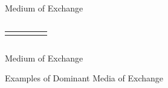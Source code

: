 \documentclass[]{beamer}
\begin{document}
\begin{frame}{Medium of Exchange}
\begin{columns}[T]
\begin{column}{0.5\textwidth}
{\begin{scriptsize}
\begin{center}
\begin{tabular}{l||c|c|c|c}
  &      &         &        & \cellcolor{black!50} \\
						\end{tabular}
					\end{center}
				\end{scriptsize}
			}
		\end{column}
	\end{columns}
\end{frame}


\begin{frame}{Medium of Exchange}
	\begin{figure}
		
	\end{figure}
\end{frame}


\begin{frame}{Examples of Dominant Media of Exchange}
	\begin{figure}
			
	\end{figure}
\end{frame}
\end{document}
